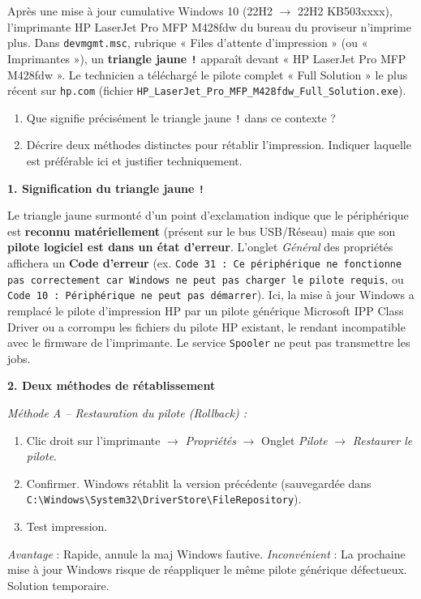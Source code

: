 \documentclass[11pt]{article}
\begin{document}
\begin{exoresolu}
Après une mise à jour cumulative Windows 10 (22H2 $\rightarrow$ 22H2 KB503xxxx), l'imprimante HP LaserJet Pro MFP M428fdw du bureau du proviseur n'imprime plus. Dans \texttt{devmgmt.msc}, rubrique « Files d'attente d'impression » (ou « Imprimantes »), un \textbf{triangle jaune \texttt{!}} apparaît devant « HP LaserJet Pro MFP M428fdw ». Le technicien a téléchargé le pilote complet « Full Solution » le plus récent sur \texttt{hp.com} (fichier \texttt{HP\_LaserJet\_Pro\_MFP\_M428fdw\_Full\_Solution.exe}).
\begin{enumerate}
\item Que signifie précisément le triangle jaune \texttt{!} dans ce contexte ?
\item Décrire deux méthodes distinctes pour rétablir l'impression. Indiquer laquelle est préférable ici et justifier techniquement.
\end{enumerate}
\tcblower
\textbf{1. Signification du triangle jaune \texttt{!}}

Le triangle jaune surmonté d'un point d'exclamation indique que le périphérique est \textbf{reconnu matériellement} (présent sur le bus USB/Réseau) mais que son \textbf{pilote logiciel est dans un état d'erreur}. L'onglet \emph{Général} des propriétés affichera un \textbf{Code d'erreur} (ex. \texttt{Code 31 : Ce périphérique ne fonctionne pas correctement car Windows ne peut pas charger le pilote requis}, ou \texttt{Code 10 : Périphérique ne peut pas démarrer}). Ici, la mise à jour Windows a remplacé le pilote d'impression HP par un pilote générique Microsoft IPP Class Driver ou a corrompu les fichiers du pilote HP existant, le rendant incompatible avec le firmware de l'imprimante. Le service \texttt{Spooler} ne peut pas transmettre les jobs.

\textbf{2. Deux méthodes de rétablissement}

\emph{Méthode A -- Restauration du pilote (Rollback) :}
\begin{enumerate}
\item Clic droit sur l'imprimante $\rightarrow$ \emph{Propriétés} $\rightarrow$ Onglet \emph{Pilote} $\rightarrow$ \emph{Restaurer le pilote}.
\item Confirmer. Windows rétablit la version précédente (sauvegardée dans \texttt{C:\textbackslash Windows\textbackslash System32\textbackslash DriverStore\textbackslash FileRepository}).
\item Test impression.
\end{enumerate}
\textit{Avantage} : Rapide, annule la maj Windows fautive. \textit{Inconvénient} : La prochaine mise à jour Windows risque de réappliquer le même pilote générique défectueux. Solution temporaire.


\end{exoresolu}
\end{document}
